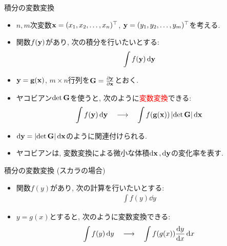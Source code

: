 \documentclass[dvipdfmx,notheorems,t]{beamer}
\begin{document}
\begin{frame}{積分の変数変換}
\begin{itemize}
  \item $n, m$次変数$\vb{x} = (x_1, x_2, \ldots, x_n)^\top$, $\vb{y} = (y_1, y_2, \ldots, y_m)^\top$を考える.
  \item 関数$f(\vb{y})$があり, 次の積分を行いたいとする:
  \begin{align*}
    \int f(\vb{y}) \dd{\vb{y}}
  \end{align*}
  \item $\vb{y} = \vb{g}(\vb{x})$, $m \times n$行列を$\vb{G} = \pdv{\vb{y}}{\vb{x}}$とおく.
  \item ヤコビアン$\det \vb{G}$を使うと, 次のように\textcolor{red}{変数変換}できる:
  \begin{align*}
    \int f(\vb{y}) \dd{\vb{y}} \quad \longrightarrow \quad
      \int f(\vb{g}(\vb{x})) \left| \det \vb{G} \right| \dd{\vb{x}}
  \end{align*}
  \item $\dd{\vb{y}} = \left| \det \vb{G} \right| \dd{\vb{x}}$のように関連付けられる.
  \item ヤコビアンは, 変数変換による微小な体積$\dd{\vb{x}}, \dd{\vb{y}}$の変化率を表す.
\end{itemize}
\end{frame}

\begin{frame}{積分の変数変換 (スカラの場合)}
\begin{itemize}
  \item 関数$f(y)$があり, 次の計算を行いたいとする:
  \begin{align*}
    \int f(y) \dd{y}
  \end{align*}
  \item $y = g(x)$とすると, 次のように変数変換できる:
  \begin{align*}
    \int f(y) \dd{y} \quad \longrightarrow \quad
      \int f(g(x)) \dv{y}{x} \dd{x}
  \end{align*}
\end{itemize}
\end{frame}
\end{document}
